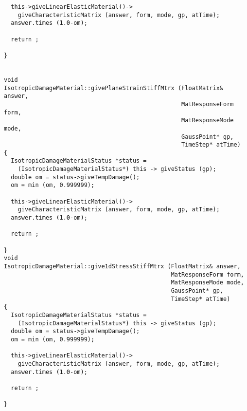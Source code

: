 \documentclass[12pt,draft]{article}
\begin{document}
{\begin{verbatim}
  this->giveLinearElasticMaterial()->
    giveCharacteristicMatrix (answer, form, mode, gp, atTime);
  answer.times (1.0-om);

  return ;
  
}


void 
IsotropicDamageMaterial::givePlaneStrainStiffMtrx (FloatMatrix& answer, 
                                                   MatResponseForm form,
                                                   MatResponseMode mode,
                                                   GaussPoint* gp, 
                                                   TimeStep* atTime)
{
  IsotropicDamageMaterialStatus *status = 
    (IsotropicDamageMaterialStatus*) this -> giveStatus (gp);
  double om = status->giveTempDamage();
  om = min (om, 0.999999);

  this->giveLinearElasticMaterial()->
    giveCharacteristicMatrix (answer, form, mode, gp, atTime);
  answer.times (1.0-om);

  return ;

}
void 
IsotropicDamageMaterial::give1dStressStiffMtrx (FloatMatrix& answer, 
                                                MatResponseForm form,
                                                MatResponseMode mode,
                                                GaussPoint* gp, 
                                                TimeStep* atTime)
{
  IsotropicDamageMaterialStatus *status = 
    (IsotropicDamageMaterialStatus*) this -> giveStatus (gp);
  double om = status->giveTempDamage();
  om = min (om, 0.999999);

  this->giveLinearElasticMaterial()->
    giveCharacteristicMatrix (answer, form, mode, gp, atTime);
  answer.times (1.0-om);

  return ;

}

\end{verbatim}}
\end{document}
